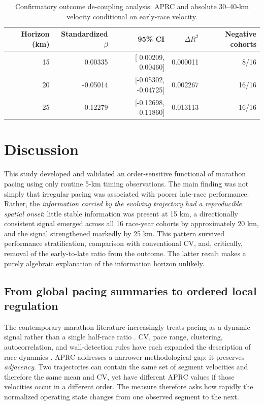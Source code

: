 \documentclass[pdflatex,sn-basic]{sn-jnl}
\begin{document}
\begin{table}[ht]
\centering
\caption{Confirmatory outcome de-coupling analysis: APRC and absolute 30--40-km velocity conditional on early-race velocity.}
\label{tab:decouple}
\begin{tabular}{rrrrr}
\toprule
Horizon (km) & Standardized $\beta$ & 95\% CI & $\Delta R^2$ & Negative cohorts \\
\midrule
15 &  0.00335 & [ 0.00209,  0.00460] & 0.000011 & 8/16 \\
20 & -0.05014 & [-0.05302, -0.04725] & 0.002267 & 16/16 \\
25 & -0.12279 & [-0.12698, -0.11860] & 0.013113 & 16/16 \\
\bottomrule
\end{tabular}
\end{table}

\section{Discussion}

This study developed and validated an order-sensitive functional of marathon pacing using only routine 5-km timing observations. The main finding was not simply that irregular pacing was associated with poorer late-race performance. Rather, the \emph{information carried by the evolving trajectory had a reproducible spatial onset}: little stable information was present at 15 km, a directionally consistent signal emerged across all 16 race-year cohorts by approximately 20 km, and the signal strengthened markedly by 25 km. This pattern survived performance stratification, comparison with conventional CV, and, critically, removal of the early-to-late ratio from the outcome. The latter result makes a purely algebraic explanation of the information horizon unlikely.

\subsection{From global pacing summaries to ordered local regulation}
The contemporary marathon literature increasingly treats pacing as a dynamic signal rather than a single half-race ratio \citep{Sha2024}. CV, pace range, clustering, autocorrelation, and wall-detection rules have each expanded the description of race dynamics \citep{Doherty2020,Dong2026}. APRC addresses a narrower methodological gap: it preserves \emph{adjacency}. Two trajectories can contain the same set of segment velocities and therefore the same mean and CV, yet have different APRC values if those velocities occur in a different order. The measure therefore asks how rapidly the normalized operating state changes from one observed segment to the next.
\end{document}
